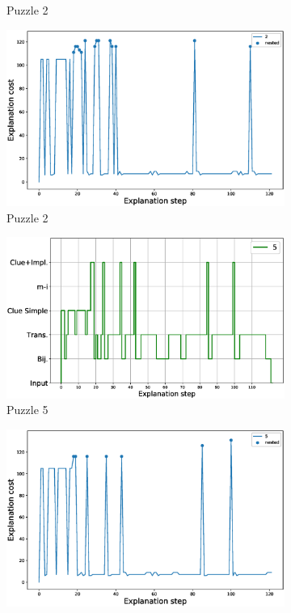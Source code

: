 \begin{figure}
\begin{subfigure}{.5\textwidth}
		\caption{Puzzle 2}
		\label{fig:composition_puzzle:p1}
	\end{subfigure}%
	\begin{subfigure}{.5\textwidth}
		\centering
		\includegraphics[width=0.84\linewidth]{figures/2.eps}
		\caption{Puzzle 2}
		\label{fig:cost_puzzle:p1}
	\end{subfigure}
	\begin{subfigure}{.5\textwidth}
		\centering
		\includegraphics[width=0.9\linewidth]{figures/plot_cost_steps_5.eps}
		\caption{Puzzle 5}
		\label{fig:composition_puzzle:p5}
	\end{subfigure}%
	\begin{subfigure}{.5\textwidth}
		\centering
		\includegraphics[width=0.84\linewidth]{figures/5.eps}

\end{subfigure}
\end{figure}
